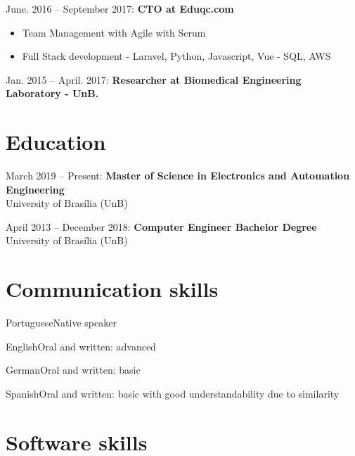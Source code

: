 \documentclass{tccv_full}
\begin{document}
	\vspace{0.7cm}
	{\large June. 2016 -- September 2017: \textbf{CTO at Eduqc.com}\\}
	\begin{itemize}
		\item \textsf{Team Management with Agile with Scrum}
		\item \textsf{Full Stack development}
		{\small 
		\subitem - Laravel, Python, Javascript, Vue
		\subitem - SQL, AWS }
	\end{itemize}
	
	{\large Jan. 2015 -- April. 2017: \textbf{Researcher at Biomedical Engineering Laboratory - UnB.} \\	
	
	
\section{Education}

	{March 2019 -- Present}: \textbf{Master of Science in Electronics and Automation Engineering}\\
	{University of Bras\'ilia (UnB)}\\	
	
	
	\vspace{0.5cm}
	


	{April 2013 -- December 2018}: \textbf{Computer Engineer Bachelor Degree}\\
	{University of Bras\'ilia (UnB)}\\
	
	


\section{Communication skills}

\begin{factlist}
\item{Portuguese}{Native speaker}
\item{English}{Oral and written: advanced}
\item{German}{Oral and written: basic}
\item{Spanish}{Oral and written: basic with good understandability due to similarity}
\end{factlist}

\section{Software skills}

}
\end{document}
